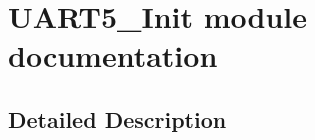 \hypertarget{group___u_a_r_t5___init__module}{}\section{U\+A\+R\+T5\+\_\+\+Init module documentation}
\label{group___u_a_r_t5___init__module}


\subsection{Detailed Description}
